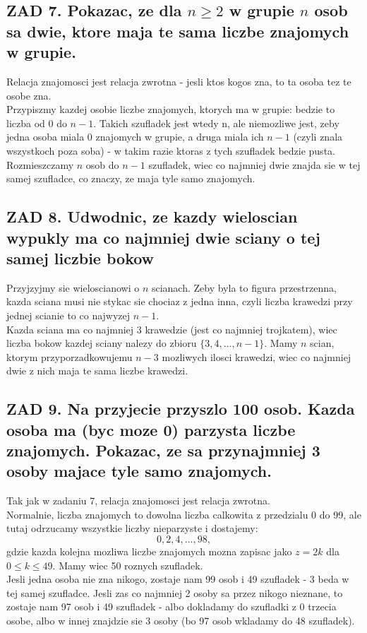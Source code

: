 \documentclass{article}
\begin{document}
\subsection*{\color{tit}ZAD 7. Pokazac, ze dla $n\geq2$ w grupie $n$ osob sa dwie, ktore maja te sama liczbe znajomych w grupie.}
  Relacja znajomosci jest relacja zwrotna - jesli ktos kogos zna, to ta osoba tez te osobe zna.\\
  Przypiszmy kazdej osobie liczbe znajomych, ktorych ma w grupie: bedzie to liczba od 0 do $n-1$. Takich szufladek jest wtedy n, ale niemozliwe jest, zeby jedna osoba miala 0 znajomych w grupie, a druga miala ich $n-1$ (czyli znala wszystkoch poza soba) - w takim razie ktoras z tych szufladek bedzie pusta. Rozmieszczamy $n$ osob do $n-1$ szufladek, wiec co najmniej dwie znajda sie w tej samej szufladce, co znaczy, ze maja tyle samo znajomych.
\subsection*{\color{tit}ZAD 8. Udwodnic, ze kazdy wieloscian wypukly ma co najmniej dwie sciany o tej samej liczbie bokow}
  Przyjzyjmy sie wieloscianowi o $n$ scianach. Zeby byla to figura przestrzenna, kazda sciana musi nie stykac sie chociaz z jedna inna, czyli liczba krawedzi przy jednej scianie to co najwyzej $n-1$.\\
  Kazda sciana ma co najmniej 3 krawedzie (jest co najmniej trojkatem), wiec liczba bokow kazdej sciany nalezy do zbioru $\{3, 4, ..., n-1\}$. Mamy $n$ scian, ktorym przyporzadkowujemu $n-3$ mozliwych ilosci krawedzi, wiec co najmniej dwie z nich maja te sama liczbe krawedzi.
\subsection*{\color{tit}ZAD 9. Na przyjecie przyszlo 100 osob. Kazda osoba ma (byc moze 0) parzysta liczbe znajomych. Pokazac, ze sa przynajmniej 3 osoby majace tyle samo znajomych.}
  Tak jak w zadaniu 7, relacja znajomosci jest relacja zwrotna.\\
  Normalnie, liczba znajomych to dowolna liczba calkowita z przedzialu 0 do 99, ale tutaj odrzucamy wszystkie liczby nieparzyste i dostajemy:
  $$0, 2, 4, ..., 98,$$
  gdzie kazda kolejna mozliwa liczbe znajomych mozna zapisac jako $z = 2k$ dla $0\leq k\leq49$. Mamy wiec 50 roznych szufladek. \\
  Jesli jedna osoba nie zna nikogo, zostaje nam 99 osob i 49 szufladek - 3 beda w tej samej szufladce. Jesli zas co najmniej 2 osoby sa przez nikogo nieznane, to zostaje nam 97 osob i 49 szufladek - albo dokladamy do szufladki z 0 trzecia osobe, albo w innej znajdzie sie 3 osoby (bo 97 osob wkladamy do 48 szufladek).
\end{document}
